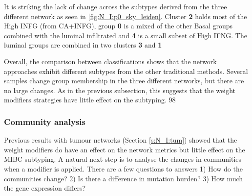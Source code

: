 It is striking the lack of change across the subtypes derived from the three different network as seen in \cref{fig:N_I:p0_sky_leiden}. Cluster \textbf{2} holds most of the High INFG (from CA+INFG), group \textbf{0} is a mixed of the other Basal groups combined with the luminal infiltrated and \textbf{4} is a small subset of High IFNG. The luminal groups are combined in two clusters \textbf{3} and \textbf{1}



Overall, the comparison between classifications shows that the network approaches exhibit different subtypes from the other traditional methods. Several samples change group membership in the three different networks, but there are no large changes. As in the previous subsection, this suggests that the weight modifiers strategies have little effect on the subtyping. 98

\subsubsection{Community analysis}

Previous results with tumour networks (Section \ref{s:N_I:tum}) showed that the weight modifiers do have an effect on the network metrics but little effect on the MIBC subtyping. A natural next step is to analyse the changes in communities when a modifier is applied. There are a few questions to answers 1) How do the communities change? 2) Is there a difference in mutation burden? 3) How much the gene expression differs? 

